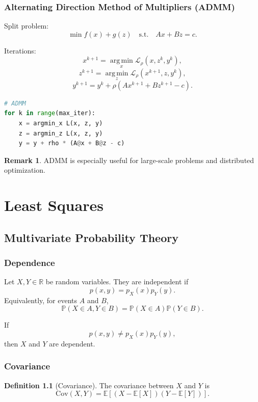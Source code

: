 \documentclass[12pt,oneside]{book}
\numberwithin{equation}{section}
\theoremstyle{definition}
\newtheorem{definition}{Definition}[section]
\newtheorem{remark}{Remark}[section]
\theoremstyle{plain}
\theoremstyle{remark}
\newcommand{\R}{\mathbb{R}}
\newcommand{\E}{\mathbb{E}}
\newcommand{\Cov}{\mathrm{Cov}}
\newcommand{\Prob}{\mathbb{P}}
\newcommand{\argmin}{\operatorname*{arg\,min}}
\begin{document}
\subsection{Alternating Direction Method of Multipliers (ADMM)}

Split problem:
\[
\min f(x) + g(z) \quad \text{s.t.} \quad Ax + Bz = c.
\]

Iterations:
\[
x^{k+1} = \argmin_x \mathcal{L}_\rho(x,z^k,y^k),
\]
\[
z^{k+1} = \argmin_z \mathcal{L}_\rho(x^{k+1},z,y^k),
\]
\[
y^{k+1} = y^k + \rho (Ax^{k+1} + Bz^{k+1} - c).
\]

\begin{lstlisting}[language=Python]
# ADMM
for k in range(max_iter):
    x = argmin_x L(x, z, y)
    z = argmin_z L(x, z, y)
    y = y + rho * (A@x + B@z - c)
\end{lstlisting}

\begin{remark}
ADMM is especially useful for large-scale problems and distributed optimization.
\end{remark}

\chapter{Least Squares}

\section{Multivariate Probability Theory}

\subsection{Dependence}

Let $X,Y \in \R$ be random variables. They are independent if
\[
p(x,y) = p_X(x)p_Y(y).
\]
Equivalently, for events $A$ and $B$,
\[
\Prob(X \in A, Y \in B) = \Prob(X \in A)\Prob(Y \in B).
\]

If
\[
p(x,y) \neq p_X(x)p_Y(y),
\]
then $X$ and $Y$ are dependent.

\subsection{Covariance}

\begin{definition}[Covariance]
The covariance between $X$ and $Y$ is
\[
\Cov(X,Y)
=
\E\left[(X-\E[X])(Y-\E[Y])\right].
\]
\end{definition}
\end{document}
